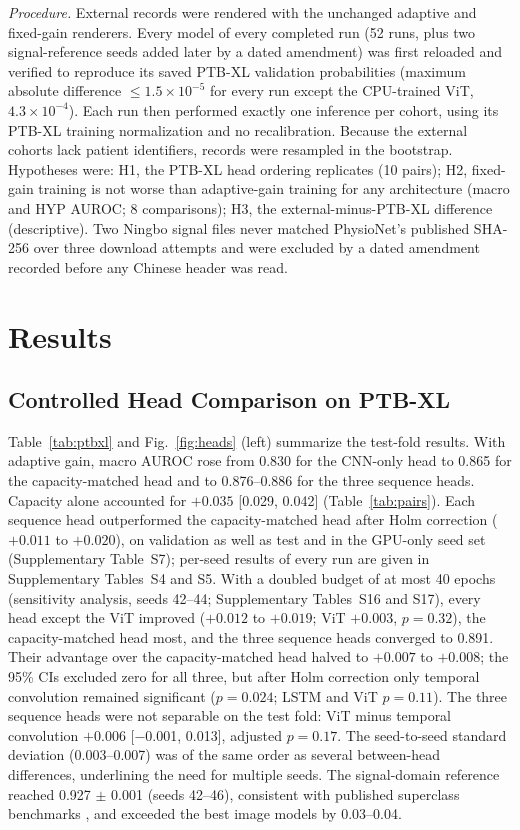 \documentclass[journal]{IEEEtran}
\begin{document}
\emph{Procedure.} External records were rendered with the unchanged adaptive and fixed-gain renderers. Every model of every completed run (52 runs, plus two signal-reference seeds added later by a dated amendment) was first reloaded and verified to reproduce its saved PTB-XL validation probabilities (maximum absolute difference $\le1.5\times10^{-5}$ for every run except the CPU-trained ViT, $4.3\times10^{-4}$). Each run then performed exactly one inference per cohort, using its PTB-XL training normalization and no recalibration. Because the external cohorts lack patient identifiers, records were resampled in the bootstrap. Hypotheses were: H1, the PTB-XL head ordering replicates (10 pairs); H2, fixed-gain training is not worse than adaptive-gain training for any architecture (macro and HYP AUROC; 8 comparisons); H3, the external-minus-PTB-XL difference (descriptive). Two Ningbo signal files never matched PhysioNet's published SHA-256 over three download attempts and were excluded by a dated amendment recorded before any Chinese header was read.

\section{Results}

\subsection{Controlled Head Comparison on PTB-XL}
Table~\ref{tab:ptbxl} and Fig.~\ref{fig:heads} (left) summarize the test-fold results. With adaptive gain, macro AUROC rose from 0.830 for the CNN-only head to 0.865 for the capacity-matched head and to 0.876--0.886 for the three sequence heads. Capacity alone accounted for $+0.035$ [0.029, 0.042] (Table~\ref{tab:pairs}). Each sequence head outperformed the capacity-matched head after Holm correction ($+0.011$ to $+0.020$), on validation as well as test and in the GPU-only seed set (Supplementary Table~S7); per-seed results of every run are given in Supplementary Tables~S4 and S5. With a doubled budget of at most 40 epochs (sensitivity analysis, seeds 42--44; Supplementary Tables~S16 and S17), every head except the ViT improved ($+0.012$ to $+0.019$; ViT $+0.003$, $p=0.32$), the capacity-matched head most, and the three sequence heads converged to 0.891. Their advantage over the capacity-matched head halved to $+0.007$ to $+0.008$; the 95\% CIs excluded zero for all three, but after Holm correction only temporal convolution remained significant ($p=0.024$; LSTM and ViT $p=0.11$). The three sequence heads were not separable on the test fold: ViT minus temporal convolution $+0.006$ [$-$0.001, 0.013], adjusted $p=0.17$. The seed-to-seed standard deviation (0.003--0.007) was of the same order as several between-head differences, underlining the need for multiple seeds. The signal-domain reference reached 0.927 $\pm$ 0.001 (seeds 42--46), consistent with published superclass benchmarks \cite{strodthoff2021benchmark}, and exceeded the best image models by 0.03--0.04.
\end{document}

